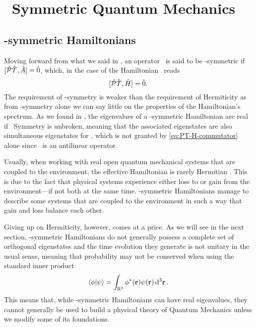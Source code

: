 \chapter{\PT\ Symmetric Quantum Mechanics}\label{ch:pt-symmetric-hamiltonians}
    \section{\PT-symmetric Hamiltonians}
        Moving forward from what we said in , an operator \hA\ is said to be \PT-symmetric if $\comm*{\hPT}{\hA}\! = \hzero$, which, in the case of the Hamiltonian \hH\ reads
        \begin{equation}
            \label{eq:PT-H-commutator}
            \comm*{\hPT}{\hH}\! = \hzero
            \myperiod
        \end{equation}
        The requirement of \PT-symmetry is weaker than the requirement of Hermiticity as from \PT-symmetry alone we can say little on the properties of the Hamiltonian's spectrum. As we found in , the eigenvalues of a \PT-symmetric Hamiltonian are real if \PT\ Symmetry is unbroken, meaning that the associated eigenstates are also simultaneous eigenstates for \hPT, which is not granted by \eqref{eq:PT-H-commutator} alone since \hPT\ is an antilinear operator.

        Usually, when working with real open quantum mechanical systems that are coupled to the environment, the effective Hamiltonian is rarely Hermitian \cite{bender2024}. This is due to the fact that physical systems experience either loss to or gain from the environment---if not both at the same time. \PT-symmetric  Hamiltonians manage to describe some systems that are coupled to the environment in such a way that gain and loss balance each other.

        Giving up on Hermiticity, however, comes at a price. As we will see in the next section, \PT-symmetric Hamiltonians do not generally possess a complete set of orthogonal eigenstates and the time evolution they generate is not unitary in the usual sense, meaning that probability may not be conserved when using the standard inner product
        \begin{equation}
            \label{eq:standard-inner-product}
            \braket{\phi}{\psi} = \int\nolimits_{\bbR^3} \phi^*\pqty{\vb{r}} \psi\pqty{\vb{r}} \dd[3]{\vb{r}}
            \myperiod
        \end{equation}
        This means that, while \PT-symmetric Hamiltonians can have real eigenvalues, they cannot generally be used to build a physical theory of Quantum Mechanics unless we modify some of its foundations.

